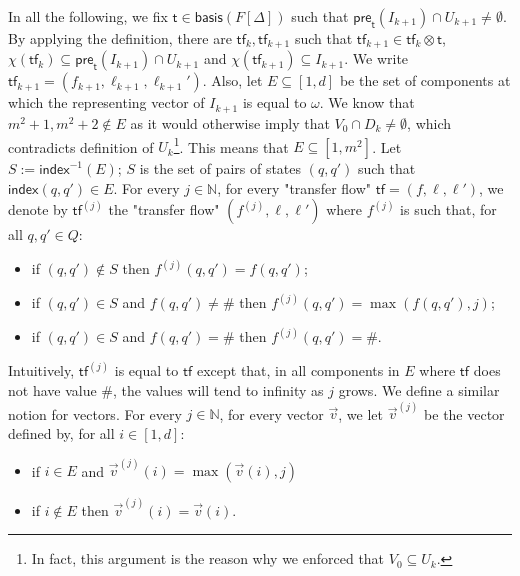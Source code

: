 \documentclass[10pt,a4paper]{article}
\let\mathbb\mathds
\newcommand{\nats}{\mathbb{N}}
\newcommand{\nset}[2]{[#1,#2]}
\newcommand{\deff}{:=}
\newcommand{\preop}{\mathsf{pre}}
\newcommand{\transitions}{\Delta}
\newcommand*{\states}{Q}
\newcommand*{\abuchistate}{\ell}
\newcommand*{\controlloc}{\abuchistate}
\newcommand*{\dummysymb}{\#}
\newcommand*{\minwqo}[1]{\mathsf{basis}(#1)}
\newcommand*{\transfersof}[1]{F[#1]}
\newcommand*{\atf}{\mathsf{tf}}
\newcommand*{\tftimes}{\otimes}
\newcommand*{\preflows}[2]{\preop_{#1}(#2)}
\newcommand*{\zerovectors}{V_0}
\newcommand{\T}{\transfersof{\transitions}}
\newcommand*{\mapencoding}{\chi}
\newcommand*{\indexof}{\mathsf{index}}
\newcommand*{\tftrans}{\mathsf{t}}
\newcommand*{\Tmin}{\minwqo{\T}}
\begin{document}
\begin{appendixproof}
	In all the following, we fix \(\tftrans \in \Tmin\) such that \(\preflows{\tftrans}{I_{k+1}} \cap U_{k+1} \ne \emptyset\).
	By applying the definition, there are \(\atf_k, \atf_{k+1}\) such that \(\atf_{k+1} \in \atf_k \tftimes \tftrans\), \(\mapencoding(\atf_k) \subseteq \preflows{\tftrans}{I_{k+1}} \cap U_{k+1}\) and \(\mapencoding(\atf_{k+1}) \subseteq I_{k+1}\).
	We write \(\atf_{k+1} = (f_{k+1}, \controlloc_{k+1}, \controlloc_{k+1}')\).
	Also, let \(E \subseteq \nset{1}{d}\) be the set of components at which the representing vector of \(I_{k+1}\) is equal to \(\omega\).
	We know that \(m^2+1, m^2+2 \notin E\) as it would otherwise imply that \(\zerovectors \cap D_k \ne \emptyset\), which contradicts definition of \(U_k\)\footnote{In fact, this argument is the reason why we enforced that \(\zerovectors \subseteq U_k\).
	}.
	This means that \(E \subseteq \nset{1}{m^2}\).
	Let \(S \deff \indexof^{-1}(E)\); \(S\) is the set of pairs of states \((q,q')\) such that \(\indexof(q,q') \in E\).
	For every \(j \in \nats\), for every "transfer flow" \(\atf = (f , \controlloc, \controlloc')\), we denote by \(\atf^{(j)}\) the "transfer flow" \((f^{(j)},\controlloc, \controlloc')\) where \(f^{(j)}\) is such that, for all \(q,q' \in \states\):
	\begin{itemize}[noitemsep,topsep=0pt,parsep=0pt,partopsep=0pt]
		\item if \((q,q') \notin S\) then \(f^{(j)}(q,q') = f(q,q')\);
		\item if \((q,q') \in S\) and \(f(q,q') \ne \dummysymb\) then \(f^{(j)}(q,q') = \max(f(q,q'), j)\);
		\item if \((q,q') \in S\) and \(f(q,q') = \dummysymb\) then \(f^{(j)}(q,q') = \dummysymb\).
	\end{itemize}

	Intuitively, \(\atf^{(j)}\) is equal to \(\atf\) except that, in all components in \(E\) where \(\atf\) does not have value \(\dummysymb\), the values will tend to infinity as \(j\) grows.
	We define a similar notion for vectors.
	For every \(j \in \nats\), for every vector \(\vec{v}\), we let \(\vec{v}^{(j)}\) be the vector defined by, for all \(i \in \nset{1}{d}\):
	\begin{itemize}[noitemsep,topsep=0pt,parsep=0pt,partopsep=0pt]
		\item if \(i \in E\) and \(\vec{v}^{(j)}(i) = \max(\vec{v}(i),j)\)
		\item if \(i \notin E\) then \(\vec{v}^{(j)}(i) = \vec{v}(i)\).
	\end{itemize}


\end{appendixproof}
\end{document}
